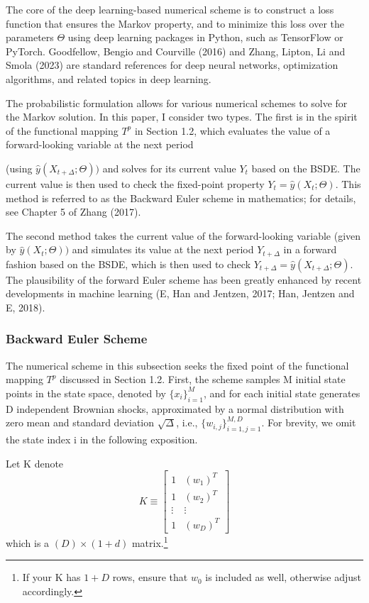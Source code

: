 \documentclass{article}
\begin{document}
The core of the deep learning-based numerical scheme is to construct a loss function that ensures the Markov property, and to minimize this loss over the parameters $\Theta$ using deep learning packages in Python, such as TensorFlow or PyTorch. Goodfellow, Bengio and Courville (2016) and Zhang, Lipton, Li and Smola (2023) are standard references for deep neural networks, optimization algorithms, and related topics in deep learning.

The probabilistic formulation allows for various numerical schemes to solve for the Markov solution. In this paper, I consider two types. The first is in the spirit of the functional mapping $T^{p}$ in Section 1.2, which evaluates the value of a forward-looking variable at the next period

\clearpage

(using $\hat{y}(X_{t+\Delta};\Theta))$ and solves for its current value $Y_{t}$ based on the BSDE. The current value is then used to check the fixed-point property $Y_{t}=\hat{y}(X_{t};\Theta)$. This method is referred to as the Backward Euler scheme in mathematics; for details, see Chapter 5 of Zhang (2017).

The second method takes the current value of the forward-looking variable (given by $\hat{y}(X_{t};\Theta))$ and simulates its value at the next period $Y_{t+\Delta}$ in a forward fashion based on the BSDE, which is then used to check $Y_{t+\Delta}=\hat{y}(X_{t+\Delta};\Theta)$. The plausibility of the forward Euler scheme has been greatly enhanced by recent developments in machine learning (E, Han and Jentzen, 2017; Han, Jentzen and E, 2018).

\subsubsection{Backward Euler Scheme}

The numerical scheme in this subsection seeks the fixed point of the functional mapping $T^{p}$ discussed in Section 1.2. First, the scheme samples M initial state points in the state space, denoted by $\{x_{i}\}_{i=1}^{M}$, and for each initial state generates D independent Brownian shocks, approximated by a normal distribution with zero mean and standard deviation $\sqrt{\Delta}$, i.e., $\{w_{i,j}\}_{i=1,j=1}^{M,D}$. For brevity, we omit the state index i in the following exposition.

Let K denote
\[
K\equiv\begin{bmatrix}1&(w_{1})^{T}\\ 1&(w_{2})^{T}\\ \vdots&\vdots\\ 1&(w_{D})^{T}\end{bmatrix}
\]
which is a $(D)\times(1+d)$ matrix.\footnote{If your K has $1+D$ rows, ensure that $w_{0}$ is included as well, otherwise adjust accordingly.}
\end{document}
